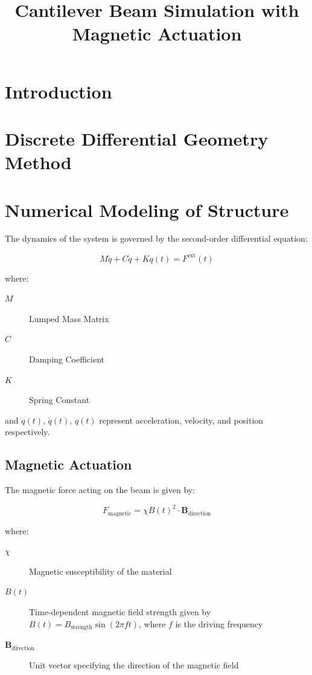 \documentclass[11pt]{article}
\date{}
\title{Cantilever Beam Simulation with Magnetic Actuation}
\begin{document}
\maketitle
\tableofcontents

\section{Introduction}
\label{sec:orgdcb5820}

\section{Discrete Differential Geometry Method}
\label{sec:org4be29e8}

\section{Numerical Modeling of Structure}
\label{sec:orgfa615c9}

The dynamics of the system is governed by the second-order differential equation:

\[ M\ddot{q} + C\dot{q} + Kq(t) = F^{\text{ext}}(t) \]

where:
\begin{description}
\item[{\(M\)}] Lumped Mass Matrix
\item[{\(C\)}] Damping Coefficient
\item[{\(K\)}] Spring Constant
\end{description}

and \(\ddot{q}(t)\), \(\dot{q}(t)\), \(q(t)\) represent acceleration, velocity, and position respectively.
\subsection{Magnetic Actuation}
\label{sec:org30cea04}

The magnetic force acting on the beam is given by:

\[F_{\text{magnetic}} = \chi B(t)^2 \cdot \mathbf{B}_{\text{direction}} \]

where:
\begin{description}
\item[{\(\chi\)}] Magnetic susceptibility of the material
\item[{\(B(t)\)}] Time-dependent magnetic field strength given by \(B(t) = B_{\text{strength}} \sin(2\pi f t)\), where \(f\) is the driving frequency
\item[{\(\mathbf{B}_{\text{direction}}\)}] Unit vector specifying the direction of the magnetic field
\end{description}
\end{document}
